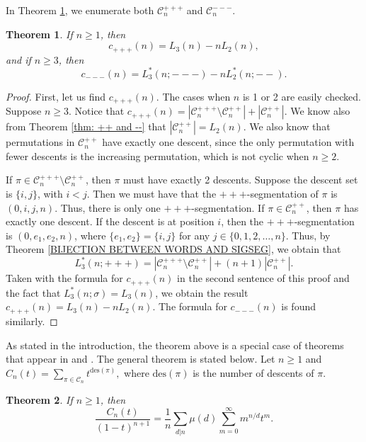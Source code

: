 \documentclass[12pt]{article}
\newcommand{\C}{\mathcal{C}}
\theoremstyle{plain}
\newtheorem{theorem}{Theorem}
\theoremstyle{definition}
\begin{document}
In Theorem \ref{thm sigma1 and sigma 2}, we enumerate both $\C_n^{+++}$ and $\C_n^{---}$. 
\begin{theorem}\label{thm sigma1 and sigma 2}
If $n\geq 1$, then $$c_{+++}(n) = L_3(n) - nL_2(n),$$ and if $n\geq 3$, then $$c_{---}(n) = L_3^*(n;---) - nL_2^*(n;--).$$
\end{theorem}
\begin{proof}
First, let us find $c_{+++}(n)$. The cases when $n$ is 1 or 2 are easily checked. Suppose $n\geq 3$. Notice that $c_{+++}(n) = |\C_n^{+++}\setminus \C_n^{++}|+|\C_n^{++}|$. We know also from Theorem \ref{thm: ++ and --} that $|\C_n^{++}|=L_2(n)$. We also know that permutations in $\C_n^{++}$ have exactly one descent, since the only permutation with fewer descents is the increasing permutation, which is not cyclic when $n\geq 2$. 

If $\pi \in \C_n^{+++}\setminus \C_n^{++}$, then $\pi$ must have exactly 2 descents. Suppose the descent set is $\{i,j\}$, with $i<j$. Then we must have that the $+++$-segmentation of $\pi$ is $(0,i,j,n)$. Thus, there is only one $+++$-segmentation. If $\pi\in\C_n^{++}$, then $\pi$ has exactly one descent. If the descent is at position $i$, then the $+++$-segmentation is $(0, e_1, e_2, n)$, where $\{e_1, e_2\} = \{i, j\}$ for any $j\in\{0,1,2,\ldots, n\}$. 
Thus, by Theorem \ref{BIJECTION BETWEEN WORDS AND SIGSEG}, we obtain that $$L_3^*(n;+++) = |\C_n^{+++}\setminus \C_n^{++}| + (n+1)|\C_n^{++}|.$$ Taken with the formula for $c_{+++}(n)$ in the second sentence of this proof and the fact that $L_3^*(n;\sigma) = L_3(n)$, we obtain the result $c_{+++}(n) = L_3(n) - nL_2(n)$.
The formula for $c_{---}(n)$ is found similarly.
\end{proof}

As stated in the introduction, the theorem above is a special case of theorems that appear in \cite{gessel} and \cite{ARCHERELIZALDE2014}. The general theorem is stated below. Let $n\geq1$ and $C_n(t) = \sum_{\pi\in\C_n} t^{\text{des}(\pi)},$ where $\text{des}(\pi)$ is the number of descents of $\pi$. 
\begin{theorem}\emph{\cite[Theorem 6.1]{gessel}}
If $n\geq 1$, then
$$
\dfrac{C_n(t)}{(1-t)^{n+1}} = \frac{1}{n} \sum_{d|n} \mu(d) \sum_{m=0}^{\infty} m^{n/d} t^m.
$$
\end{theorem}
\end{document}
